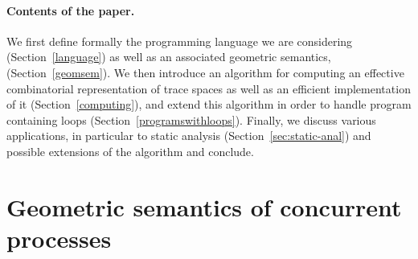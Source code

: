\documentclass[orivec]{llncs} \usepackage[T1]{fontenc}
\begin{document}
\paragraph{Contents of the paper.}
We first define formally the programming language we are considering
(Section~\ref{language}) as well as an associated geometric semantics, (Section~\ref{geomsem}). We then
introduce an algorithm for computing an effective combinatorial representation
of trace spaces as well as an efficient implementation of it
(Section~\ref{computing}), and extend this algorithm in order to handle program
containing loops (Section~\ref{programswithloops}). Finally, we discuss various
applications, in particular to static analysis (Section~\ref{sec:static-anal})
and possible extensions of the algorithm and conclude.

\section{Geometric semantics of concurrent processes}
\end{document}
